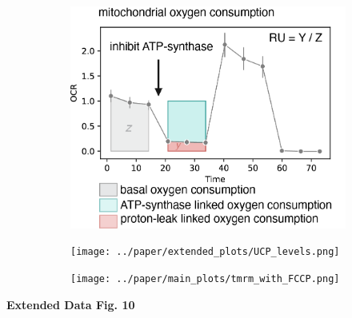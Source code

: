 \begin{figure}[H]
    \begin{subfigure}[t]{0.33\textwidth}
        \caption{}
        \includegraphics[width=\textwidth]{../paper/main_plots/seahorse_cartoon.png}        
    \end{subfigure}  
    \hspace{1cm}
    \begin{subfigure}[t]{0.3\textwidth}
        \caption{}
        \texttt{[image: ../paper/extended\_plots/UCP\_levels.png]}        
    \end{subfigure} 
    \par
    \centering
    \begin{subfigure}[t]{0.65\textwidth}
        \caption{}
        \texttt{[image: ../paper/main\_plots/tmrm\_with\_FCCP.png]}        
    \end{subfigure} 
 \end{figure}
\textbf{Extended Data Fig. 10}